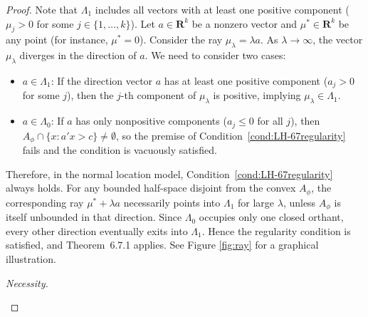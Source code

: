 \documentclass[12pt]{article}
\theoremstyle{definition}
\theoremstyle{remark}
\begin{document}
\begin{proof}
Note that $\Lambda_1$ includes all vectors with at least one positive component ($\mu_j > 0$ for some $j\in \{1,\dots,k\}$). Let $a \in \mathbf{R}^k$ be a nonzero vector and $\mu^* \in \mathbf{R}^k$ be any point (for instance, $\mu^* = 0$). Consider the ray $\mu_{\lambda} = \lambda a$. As $\lambda \to \infty$, the vector $\mu_{\lambda}$ diverges in the direction of $a$. We need to consider two cases: 
\begin{itemize}
    \item $a\in \Lambda_1$: If the direction vector $a$ has at least one positive component ($a_j > 0$ for some $j$), then the $j$-th component of $\mu_{\lambda}$ is positive, implying $\mu_{\lambda} \in \Lambda_1$.
    \item $a\in \Lambda_0$: If $a$ has only nonpositive components ($a_j \le 0$ for all $j$), then $A_\phi\cap\{x:a'x>c\}\ne \emptyset$, so the premise of Condition~\ref{cond:LH-67regularity} fails and the condition is vacuously satisfied.
\end{itemize}
Therefore, in the normal location model, Condition~\ref{cond:LH-67regularity} always holds. For any bounded half-space disjoint from the convex $A_\phi$, the corresponding ray $\mu^*+\lambda a$ necessarily points into $\Lambda_1$ for large $\lambda$, unless $A_\phi$ is itself unbounded in that direction. Since $\Lambda_0$ occupies only one closed orthant, every other direction eventually exits into $\Lambda_1$. Hence the regularity condition is satisfied, and Theorem~6.7.1 applies. See Figure \ref{fig:ray} for a graphical illustration. 

\noindent\emph{Necessity.}


\begin{figure}[h!]
\centering
{}
\end{figure}
\end{proof}
\end{document}
